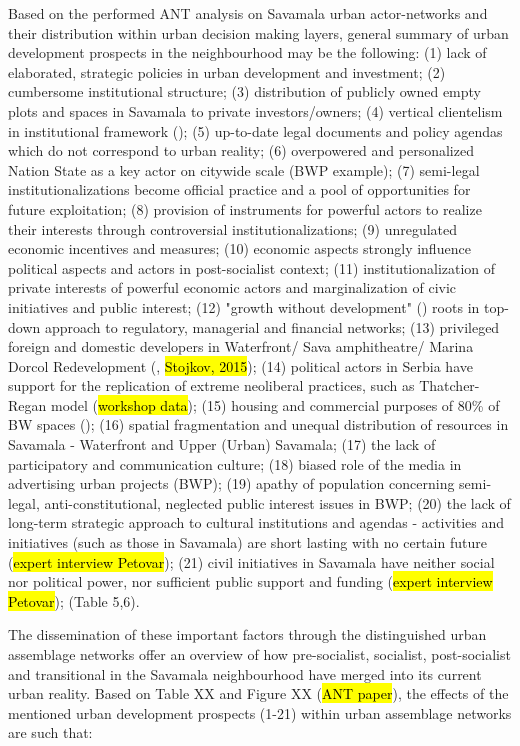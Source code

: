 \documentclass[11pt]{report}
\begin{document}
Based on the performed ANT analysis on Savamala urban actor-networks and their distribution within urban decision making layers, general summary of urban development prospects in the neighbourhood may be the following:
(1) lack of elaborated, strategic policies in urban development and investment;
(2) cumbersome institutional structure;
(3) distribution of publicly owned empty plots and spaces in Savamala to private investors/owners;
(4) vertical clientelism in institutional framework (\cite{Vujovic and Petrovic, 2007});
(5) up-to-date legal documents and policy agendas which do not correspond to urban reality;
(6) overpowered and personalized Nation State as a key actor on citywide scale (BWP example);
(7) semi-legal institutionalizations become official practice and a pool of opportunities for future exploitation;
(8) provision of instruments for powerful actors to realize their interests through controversial institutionalizations;
(9) unregulated economic incentives and measures;
(10) economic aspects strongly influence political aspects and actors in post-socialist context;
(11) institutionalization of private interests of powerful economic actors and marginalization of civic initiatives and public interest;
(12) "growth without development" (\cite{Vujosevic and Maricic, 2012}) roots in top-down approach to regulatory, managerial and financial networks;
(13) privileged foreign and domestic developers in Waterfront/ Sava amphitheatre/ Marina Dorcol Redevelopment (\cite{Djordjevic and Dabovic, 2009}, \hl{Stojkov, 2015});
(14) political actors in Serbia have support for the replication of extreme neoliberal practices, such as Thatcher-Regan model (\hl{workshop data});
(15) housing and commercial purposes of 80\% of BW spaces (\cite{Zekovic et al., 2016}); 
(16) spatial fragmentation and unequal distribution of resources in Savamala - Waterfront and Upper (Urban) Savamala;
(17) the lack of participatory and communication culture;
(18) biased role of the media in advertising urban projects (BWP);
(19) apathy of population concerning semi-legal, anti-constitutional, neglected public interest issues in BWP;
(20) the lack of long-term strategic approach to cultural institutions and agendas - activities and initiatives (such as those in Savamala) are short lasting with no certain future (\hl{expert interview Petovar});
(21) civil initiatives in Savamala have neither social nor political power, nor sufficient public support and funding (\hl{expert interview Petovar});
(Table 5,6). 

The dissemination of these important factors through the distinguished urban assemblage networks offer an overview of how pre-socialist, socialist, post-socialist and transitional in the Savamala neighbourhood have merged into its current urban reality.
Based on Table XX and Figure XX (\hl{ANT paper}), the effects of the mentioned urban development prospects (1-21) within urban assemblage networks are such that:
\\
\end{document}
